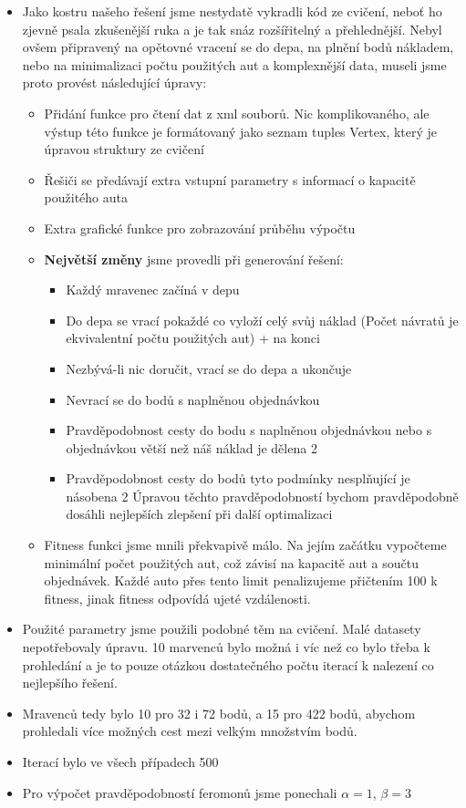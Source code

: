\documentclass[a4paper]{article}
\newenvironment{ukol}[2][]{\begin{trivlist} 
\item[\hskip \labelsep {\bfseries #1}\hskip \labelsep {\bfseries #2}]}{\end{trivlist}}
\begin{document}
\begin{ukol}{Řešení problému}
\begin{itemize}
	\item Jako kostru našeho řešení jsme nestydatě vykradli kód ze cvičení, neboť ho zjevně psala zkušenější ruka a je tak snáz rozšířitelný a přehlednější. Nebyl ovšem připravený na opětovné vracení se do depa, na plnění bodů nákladem, nebo na minimalizaci počtu použitých aut a komplexnější data, museli jsme proto provést následující úpravy:
	\begin{itemize}
		\item Přidání funkce pro čtení dat z xml souborů. Nic komplikovaného, ale výstup této funkce je formátovaný jako seznam tuples Vertex, který je úpravou struktury ze cvičení
		\item Řešiči se předávají extra vstupní parametry s informací o kapacitě použitého auta
		\item Extra grafické funkce pro zobrazování průběhu výpočtu
		\item \textbf{Největší změny} jsme provedli při generování řešení:
		 \begin{itemize}
			\item Každý mravenec začíná v depu
			\item Do depa se vrací pokaždé co vyloží celý svůj náklad (Počet návratů je ekvivalentní počtu použitých aut) + na konci
			\item Nezbývá-li nic doručit, vrací se do depa a ukončuje
			\item Nevrací se do bodů s naplněnou objednávkou
			\item Pravděpodobnost cesty do bodu s naplněnou objednávkou nebo s objednávkou větší než náš náklad je dělena 2
			\item Pravděpodobnost cesty do bodů tyto podmínky nesplňující je násobena 2
			Úpravou těchto pravděpodobností bychom pravděpodobně dosáhli nejlepších zlepšení při další optimalizaci
		\end{itemize}
		\item Fitness funkci jsme mnili překvapivě málo. Na jejím začátku vypočteme minimální počet použitých aut, což závisí na kapacitě aut a součtu objednávek. Každé auto přes tento limit penalizujeme přičtením 100 k fitness, jinak fitness odpovídá ujeté vzdálenosti. 
	\end{itemize}
	\item Použité parametry jsme použili podobné těm na cvičení. Malé datasety nepotřebovaly úpravu. 10 marvenců bylo možná i víc než co bylo třeba k prohledání a je to pouze otázkou dostatečného počtu iterací k nalezení co nejlepšího řešení. 
	\item Mravenců tedy bylo 10 pro 32 i 72 bodů, a 15 pro 422 bodů, abychom prohledali více možných cest mezi velkým množstvím bodů.
	\item Iterací bylo ve všech případech 500
	\item Pro výpočet pravděpodobností feromonů jsme ponechali $\alpha = 1$, $\beta = 3$
\end{itemize}

\end{ukol}
\end{document}
